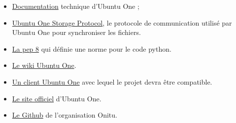 \begin{itemize}
\renewcommand{\labelitemi}{$\bullet$}
\item \href{https://wiki.ubuntu.com/UbuntuOne/TechnicalDetails}{Documentation} technique d'Ubuntu One ;
\item \href{http://bazaar.launchpad.net/~ubuntuone-control-tower/ubuntuone-storage-protocol/trunk/files}{Ubuntu One Storage Protocol}, le protocole de communication utilisé par Ubuntu One pour synchroniser les fichiers.
\item \href{http://www.python.org/dev/peps/pep-0008/}{La pep 8} qui définie une
norme pour le code python.
\item \href{https://wiki.ubuntu.com/UbuntuOne}{Le wiki Ubuntu One}.
\item
\href{http://bazaar.launchpad.net/~ubuntuone-control-tower/ubuntuone-client-gnome/trunk/files}{Un
client Ubuntu One} avec lequel le projet devra être compatible.
\item \href{https://one.ubuntu.com/dashboard/}{Le site officiel} d'Ubuntu One.
\item \href{https://github.com/onitu/}{Le Github} de l'organisation Onitu.
\end{itemize}
